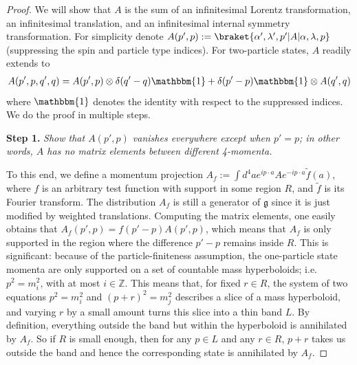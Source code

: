  \begin{proof}
     We will  show that $A$ is the sum   of an infinitesimal
Lorentz transformation, an infinitesimal translation,
and an infinitesimal internal symmetry transformation.  For simplicity denote $A(p',p) := \braket{\alpha',\lambda',p'|A|\alpha,\lambda,p}$  (suppressing the spin and particle type indices). For two-particle states, $A$ readily extends to \begin{align}
    A(p',p,q',q) = A(p',p) \otimes \delta(q' - q)\mathbbm{1} +  \delta(p' - p)\mathbbm{1}\otimes A(q',q) 
\end{align} where $\mathbbm{1}$ denotes the identity with respect to the suppressed indices. We do the proof in multiple steps. 
\vspace{3pt}


\noindent\textbf{Step 1.} \textit{Show that $A(p',p)$ vanishes everywhere except when $p' = p$; in other words, $A$ has no matrix elements between different 4-momenta.}
\vspace{2pt}


To this end, we define a momentum projection $A_f:= \int d^4a e^{i p \cdot a}Ae^{-ip\cdot a} \tilde{f}(a)$, where $f$ is an arbitrary test function with support in some region $R$, and $\tilde{f}$ is its Fourier transform. The distribution $A_f$ is still a generator of $\mathfrak{g}$ since it is just modified by weighted translations. Computing the matrix elements, one easily obtains that $A_f(p',p) = f(p' - p)A(p',p)$, which means that $A_f$ is only supported in the region where the difference $p' - p$ remains inside $R$.   This is significant: because of the particle-finiteness assumption, the one-particle state momenta are only supported on a set of countable mass hyperboloids; i.e. $p^2 = m^2_i$, with at most $i \in \mathbb{Z}$. This means that, for fixed $r\in R$, the system of two equations  $p^2 = m_i^2$  and $(p + r)^2 = m_j^2$ describes a slice of a mass hyperboloid, and varying $r$ by a small amount turns this slice into a thin band $L$. By definition, everything outside the band but within the hyperboloid is annihilated by $A_f$. So if $R$ is small enough, then for any $p\in L$ and any $r\in R$, $p + r$ takes us outside the band and hence the corresponding state is annihilated by $A_f$. 


\end{proof}
